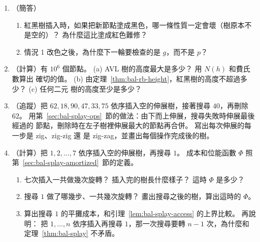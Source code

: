 \begin{enumerate}
\item （簡答）
\begin{enumerate}
\item 紅黑樹插入時，如果把新節點塗成黑色，哪一條性質一定會壞（樹原本不是空的）？
為什麼這比塗成紅色難修？
\item 情況 1 改色之後，為什麼下一輪要檢查的是 $g$，而不是 $p$？
\end{enumerate}

\item （計算）有 $10^6$ 個節點。 (a) AVL 樹的高度最大是多少？ 用 $N(h)$ 和費氏數算出
確切的值。 (b) 由定理~\ref{thm:bal-rb-height}，紅黑樹的高度不超過多少？ (c) 任何二元
樹的高度至少是多少？

\item （追蹤）把 $62, 18, 90, 47, 33, 75$ 依序插入空的伸展樹，接著搜尋 $40$，再刪除
$62$。 用第~\ref{sec:bal-splay-ops}~節的做法：由下而上伸展，搜尋失敗時伸展最後經過的
節點，刪除時在左子樹裡伸展最大的節點再合併。 寫出每次伸展的每一步是 zig、zig-zig 還
是 zig-zag，並畫出每個操作完成後的樹。

\item （計算）把 $1, 2, \ldots, 7$ 依序插入空的伸展樹，再搜尋 $1$。 成本和位能函數
$\Phi$ 照第~\ref{sec:bal-splay-amortized}~節的定義。
\begin{enumerate}
\item 七次插入一共做幾次旋轉？ 插入完的樹長什麼樣子？ 這時 $\Phi$ 是多少？
\item 搜尋 $1$ 做了哪幾步、一共幾次旋轉？ 畫出搜尋之後的樹，算出這時的 $\Phi$。
\item 算出搜尋 $1$ 的平攤成本，和引理~\ref{lem:bal-splay-access} 的上界比較。 再說明：
把 $1, \ldots, n$ 依序插入再搜尋 $1$，那一次搜尋要轉 $n - 1$ 次，為什麼和
定理~\ref{thm:bal-splay} 不矛盾。
\end{enumerate}


\end{enumerate}
